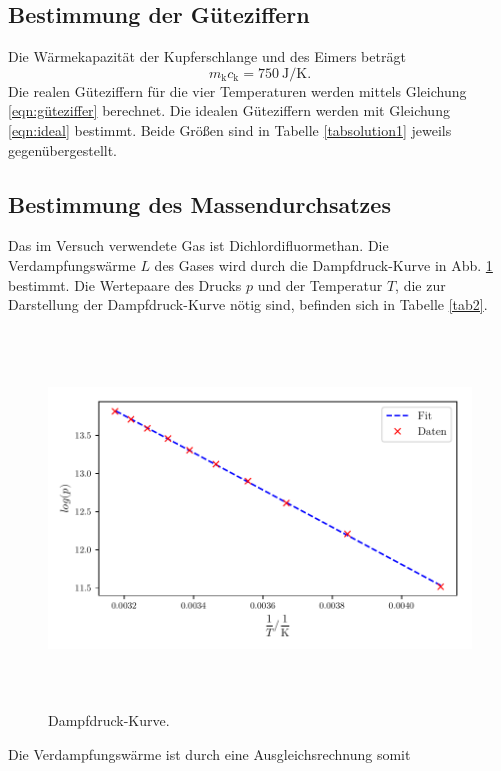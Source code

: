 \subsection{Bestimmung der Güteziffern}
Die Wärmekapazität der Kupferschlange und des Eimers beträgt
\begin{equation*}
    m_\text{k} c_\text{k} = \SI{750}{\joule\per\kelvin}.
\end{equation*}
Die realen Güteziffern für die vier Temperaturen werden mittels
Gleichung \eqref{eqn:güteziffer} berechnet. %
Die idealen Güteziffern werden mit Gleichung \eqref{eqn:ideal} %
bestimmt.
Beide Größen sind in Tabelle \ref{tabsolution1} jeweils
gegenübergestellt.


\subsection{Bestimmung des Massendurchsatzes}
Das im Versuch verwendete Gas ist Dichlordifluormethan.
Die Verdampfungswärme $L$ des Gases wird durch die Dampfdruck-Kurve
in Abb. \ref{fig:plot2} bestimmt. %
Die Wertepaare des Drucks $p$ und der Temperatur $T$, die zur
Darstellung der Dampfdruck-Kurve nötig sind, befinden sich in
Tabelle \ref{tab2}. 

\begin{figure}
    \centering
    \includegraphics[width=14cm, height=10cm]{build/plot2.pdf}
    \caption{Dampfdruck-Kurve.}
    \label{fig:plot2}
\end{figure}
Die Verdampfungswärme ist durch eine Ausgleichsrechnung somit %
